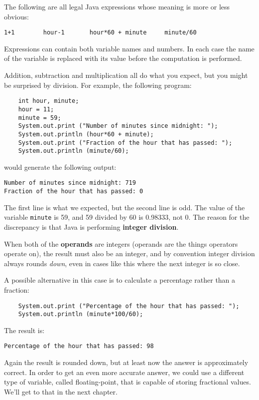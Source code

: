 \documentclass{book}
\begin{document}
The following are all legal Java expressions whose meaning is
more or less obvious:

\begin{verbatim}
1+1        hour-1       hour*60 + minute     minute/60
\end{verbatim}
%
Expressions can contain both variable
names and numbers.  In each case the name of the variable is
replaced with its value before the computation is performed.


Addition, subtraction and multiplication all do what you
expect, but you might be surprised by division.  For example,
the following program:

\begin{verbatim}
    int hour, minute;
    hour = 11;
    minute = 59;
    System.out.print ("Number of minutes since midnight: ");
    System.out.println (hour*60 + minute);
    System.out.print ("Fraction of the hour that has passed: ");
    System.out.println (minute/60);
\end{verbatim}
%
would generate the following output:

\begin{verbatim}
Number of minutes since midnight: 719
Fraction of the hour that has passed: 0
\end{verbatim}
%
The first line is what we expected, but the second line is
odd.  The value of the variable {\tt minute} is 59, and
59 divided by 60 is 0.98333, not 0.  The reason for the
discrepancy is that Java is performing {\bf integer division}.


When both of the {\bf operands} are integers (operands are the things
operators operate on), the result must also be an integer,
and by convention integer division always rounds {\em down},
even in cases like this where the next integer is so close.

A possible alternative in this case is to calculate a percentage
rather than a fraction:

\begin{verbatim}
    System.out.print ("Percentage of the hour that has passed: ");
    System.out.println (minute*100/60);
\end{verbatim}
%
The result is:

\begin{verbatim}
Percentage of the hour that has passed: 98
\end{verbatim}
%
Again the result is rounded down, but at least now the answer
is approximately correct.  In order to get an even more accurate
answer, we could use a different type of variable, called
floating-point, that is capable of storing fractional values.
We'll get to that in the next chapter.
\end{document}
